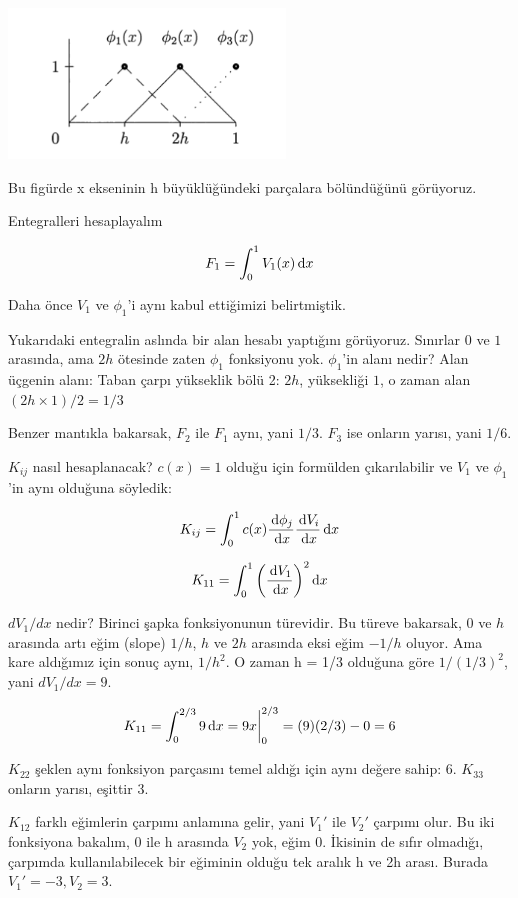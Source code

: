 \documentclass[12pt,fleqn]{article}\usepackage{../../common}
\begin{document}
\includegraphics[height=4cm]{fem_hat.png}

Bu figürde x ekseninin h büyüklüğündeki parçalara bölündüğünü görüyoruz. 

Entegralleri hesaplayalım

$$ F_1 = \int_0^1 V_1(x) \,\mathrm{d} x $$

Daha önce $V_1$ ve $\phi_1$'i aynı kabul ettiğimizi belirtmiştik. 

Yukarıdaki entegralin aslında bir alan hesabı yaptığını
görüyoruz. Sınırlar $0$ ve $1$ arasında, ama $2h$ ötesinde zaten
$\phi_1$ fonksiyonu yok. $\phi_1$'in alanı nedir? Alan üçgenin alanı:
Taban çarpı yükseklik bölü 2: $2h$, yüksekliği $1$, o zaman alan $(2h
\times 1) / 2 = 1/3$

Benzer mantıkla bakarsak, $F_2$ ile $F_1$ aynı, yani $1/3$. $F_3$ ise
onların yarısı, yani $1/6$.

$K_{ij}$ nasıl hesaplanacak? $c(x) = 1$ olduğu için formülden
çıkarılabilir ve $V_1$ ve $\phi_1$'in aynı olduğuna söyledik:

$$ K_{ij} = \int_0^1 c(x) \frac{\,\mathrm{d}\phi_j}{\,\mathrm{d} x} \frac{\,\mathrm{d} V_i}{\,\mathrm{d} x} \,\mathrm{d} x $$

$$ K_{11} = \int_0^1 \bigg( \frac{\,\mathrm{d} V_1}{\,\mathrm{d} x} \bigg) ^2 \,\mathrm{d} x  $$

$dV_1/dx$ nedir? Birinci şapka fonksiyonunun türevidir. Bu türeve
bakarsak, $0$ ve $h$ arasında artı eğim (slope) $1/h$, $h$ ve $2h$
arasında eksi eğim $-1/h$ oluyor. Ama kare aldığımız için sonuç aynı,
$1/h^2$. O zaman h = 1/3 olduğuna göre $1/(1/3)^2$, yani $dV_1/dx =
9$.

$$ K_{11} = \int_0^{2/3} 9 \,\mathrm{d} x = 9x \bigg|_0^{2/3} = (9)(2/3) - 0 = 6 $$

$K_{22}$ şeklen aynı fonksiyon parçasını temel aldığı için aynı değere
sahip: 6. $K_{33}$ onların yarısı, eşittir 3.

$K_{12}$ farklı eğimlerin çarpımı anlamına gelir, yani $V_1'$ ile
$V_2'$ çarpımı olur. Bu iki fonksiyona bakalım, 0 ile h arasında $V_2$
yok, eğim 0. İkisinin de sıfır olmadığı, çarpımda kullanılabilecek bir
eğiminin olduğu tek aralık h ve 2h arası. Burada $V_1' = -3, V_2 = 3$.
\end{document}
